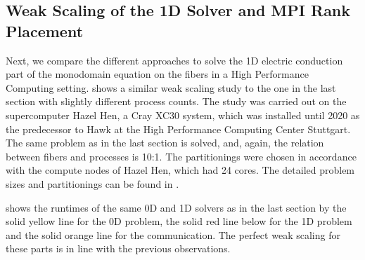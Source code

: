 
\subsection{Weak Scaling of the 1D Solver and MPI Rank Placement}\label{sec:mpi_rank_placement}


Next, we compare the different approaches to solve the 1D electric conduction part of the monodomain equation on the fibers in a High Performance Computing setting.
 shows a similar weak scaling study to the one in the last section with slightly different process counts. The study was carried out on the supercomputer Hazel Hen, a Cray XC30 system, which was installed until 2020 as the predecessor to Hawk at the High Performance Computing Center Stuttgart. The same problem as in the last section is solved, and, again, the relation between fibers and processes is 10:1. The partitionings were chosen in accordance with the compute nodes of Hazel Hen, which had 24 cores. The detailed problem sizes and partitionings can be found in \cite{Maier2019}.

 shows the runtimes of the same 0D and 1D solvers as in the last section by the solid yellow line for the 0D problem, the solid red line below for the 1D problem and the solid orange line for the communication. The perfect weak scaling for these parts is in line with the previous observations.

